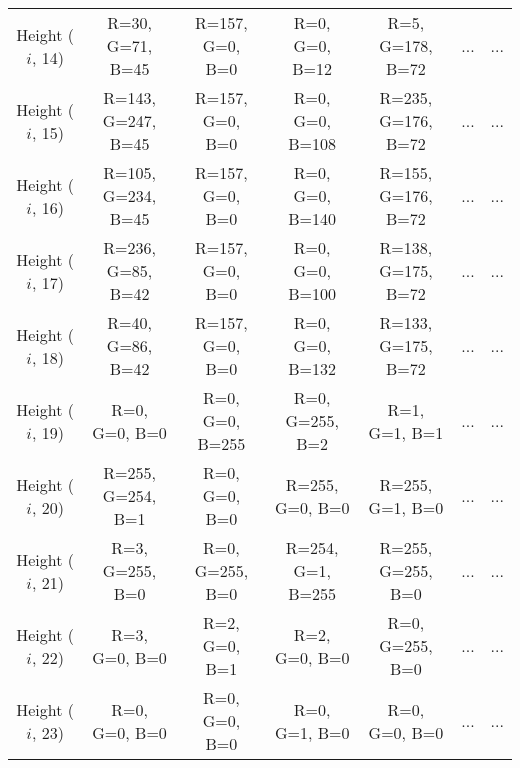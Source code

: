 \documentclass[]{article}
\begin{document}
\begin{table}[H]
\begin{center}
\begin{tabular}{ccccccc}
    			\footnotesize Height ($i$, 14) & \scriptsize R=30, G=71, B=45 & \scriptsize R=157, G=0, B=0 & \scriptsize R=0, G=0, B=12 & \scriptsize R=5, G=178, B=72 & ...& ... \\
    			
    			\footnotesize Height ($i$, 15) & \scriptsize R=143, G=247, B=45 & \scriptsize R=157, G=0, B=0 & \scriptsize R=0, G=0, B=108 & \scriptsize R=235, G=176, B=72 & ...& ... \\
    			
    			\footnotesize Height ($i$, 16) & \scriptsize R=105, G=234, B=45 & \scriptsize R=157, G=0, B=0 & \scriptsize R=0, G=0, B=140 & \scriptsize R=155, G=176, B=72 & ...& ... \\
    			
    			\footnotesize Height ($i$, 17) & \scriptsize R=236, G=85, B=42 & \scriptsize R=157, G=0, B=0 & \scriptsize R=0, G=0, B=100 & \scriptsize R=138, G=175, B=72 & ... & ...\\
    			
    			\footnotesize Height ($i$, 18) & \scriptsize R=40, G=86, B=42 & \scriptsize R=157, G=0, B=0 & \scriptsize R=0, G=0, B=132 & \scriptsize R=133, G=175, B=72 & ... & ...\\
    			
    			\footnotesize Height ($i$, 19) & \scriptsize R=0, G=0, B=0 & \scriptsize R=0, G=0, B=255 & \scriptsize R=0, G=255, B=2 & \scriptsize R=1, G=1, B=1 & ... & ...\\
    			
    			\footnotesize Height ($i$, 20) & \scriptsize R=255, G=254, B=1 & \scriptsize R=0, G=0, B=0 & \scriptsize R=255, G=0, B=0 & \scriptsize R=255, G=1, B=0 & ... & ...\\
    			
    			\footnotesize Height ($i$, 21) & \scriptsize R=3, G=255, B=0 & \scriptsize R=0, G=255, B=0 & \scriptsize R=254, G=1, B=255 & \scriptsize R=255, G=255, B=0 & ... & ...\\
    			
    			\footnotesize Height ($i$, 22) & \scriptsize R=3, G=0, B=0 & \scriptsize R=2, G=0, B=1 & \scriptsize R=2, G=0, B=0 & \scriptsize R=0, G=255, B=0 & ... & ...\\
    			
    			\footnotesize Height ($i$, 23) & \scriptsize R=0, G=0, B=0 & \scriptsize R=0, G=0, B=0 & \scriptsize R=0, G=1, B=0 & \scriptsize R=0, G=0, B=0 & ... & ...\\
    			

\end{tabular}
\end{center}
\end{table}
\end{document}
